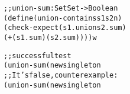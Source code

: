 \documentclass[12pt]{article}                   %
\newenvironment{solution}{\color{Red}}{}
\begin{document}
\begin{problem}
\begin{enumerate}
\end{enumerate}

\begin{solution}
\begin{alltt}
;; union-sum : Set Set -> Boolean
(define (union-contains s1 s2 n)
  (check-expect (s1 . union s2 . sum)
                (+ (s1 . sum) (s2 . sum))))w

;; successful test
(union-sum (new singleton% 17) e)
;; It's false, counterexample:
(union-sum (new singleton% 17) (new singleton% 17))
\end{alltt}
\end{solution}

\newpage
\ifrubric{}
\newpage
\fi
\end{problem}
\end{document}
